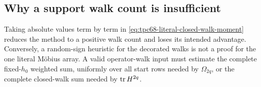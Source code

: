 \subsection{Why a support walk count is insufficient}

Taking absolute values term by term in
\eqref{eq:tpc68-literal-closed-walk-moment} reduces the method to a
positive walk count and loses its intended advantage.  Conversely, a
random-sign heuristic for the decorated walks is not a proof for the one
literal M\"obius array.  A valid operator-walk input must estimate the
complete fixed-\(h_0\) weighted sum, uniformly over all start rows needed
by \(\Omega_{2q}\), or the complete closed-walk sum needed by
\(\operatorname{tr} H^{2q}\).
